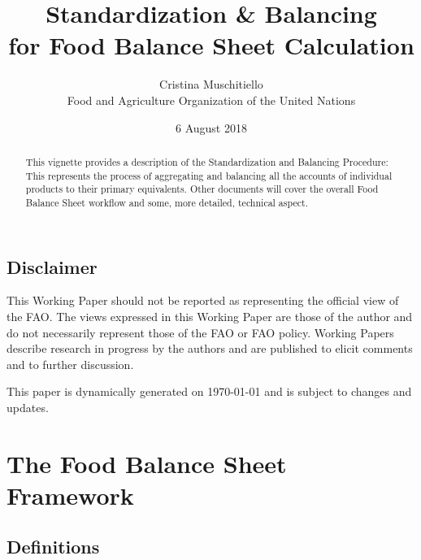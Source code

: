 \documentclass[]{article}
\title{Standardization \& Balancing\\
for Food Balance Sheet Calculation}
\author{Cristina Muschitiello\\
Food and Agriculture Organization of the United Nations}
\date{6 August 2018}
\begin{document}
\maketitle
\begin{abstract}
This vignette provides a description of the Standardization and
Balancing Procedure: This represents the process of aggregating and
balancing all the accounts of individual products to their primary
equivalents. Other documents will cover the overall Food Balance Sheet
workflow and some, more detailed, technical aspect.
\end{abstract}

{
\setcounter{tocdepth}{4}
\tableofcontents
}
\newpage

\listoftables

\listoffigures

\newpage

\subsection*{Disclaimer}\label{disclaimer}

This Working Paper should not be reported as representing the official
view of the FAO. The views expressed in this Working Paper are those of
the author and do not necessarily represent those of the FAO or FAO
policy. Working Papers describe research in progress by the authors and
are published to elicit comments and to further discussion.

This paper is dynamically generated on \today{} and is subject to
changes and updates.

\section*{The Food Balance Sheet
Framework}\label{the-food-balance-sheet-framework}

\subsection*{Definitions}\label{definitions}
\end{document}
